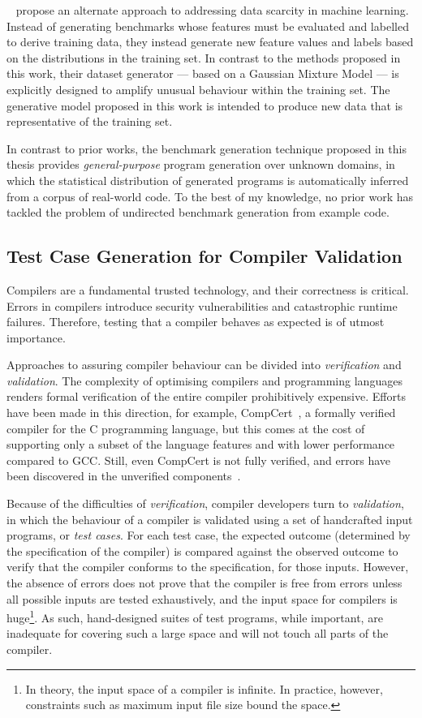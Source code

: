 \citeauthor{Ding2019}~\cite{Ding2019} propose an alternate approach to addressing data scarcity in machine learning. Instead of generating benchmarks whose features must be evaluated and labelled to derive training data, they instead generate new feature values and labels based on the distributions in the training set. In contrast to the methods proposed in this work, their dataset generator --- based on a Gaussian Mixture Model --- is explicitly designed to amplify unusual behaviour within the training set. The generative model proposed in this work is intended to produce new data that is representative of the training set.

In contrast to prior works, the benchmark generation technique proposed in this thesis provides \emph{general-purpose} program generation over unknown domains, in which the statistical distribution of generated programs is automatically inferred from a corpus of real-world code. To the best of my knowledge, no prior work has tackled the problem of undirected benchmark generation from example code.


\subsection{Test Case Generation for Compiler Validation}

Compilers are a fundamental trusted technology, and their correctness is critical. Errors in compilers introduce security vulnerabilities and catastrophic runtime failures. Therefore, testing that a compiler behaves as expected is of utmost importance.

Approaches to assuring compiler behaviour can be divided into \emph{verification} and \emph{validation}. The complexity of optimising compilers and programming languages renders formal verification of the entire compiler prohibitively expensive. Efforts have been made in this direction, for example, CompCert~\cite{Leroy2013}, a formally verified compiler for the C programming language, but this comes at the cost of supporting only a subset of the language features and with lower performance compared to GCC. Still, even CompCert is not fully verified, and errors have been discovered in the unverified components~\cite{Yang2011}.

Because of the difficulties of \emph{verification}, compiler developers turn to \emph{validation}, in which the behaviour of a compiler is validated using a set of handcrafted input programs, or \emph{test cases}. For each test case, the expected outcome (determined by the specification of the compiler) is compared against the observed outcome to verify that the compiler conforms to the specification, for those inputs. However, the absence of errors does not prove that the compiler is free from errors unless all possible inputs are tested exhaustively, and the input space for compilers is huge\footnote{In theory, the input space of a compiler is infinite. In practice, however, constraints such as maximum input file size bound the space.}. As such, hand-designed suites of test programs, while important, are inadequate for covering such a large space and will not touch all parts of the compiler.

